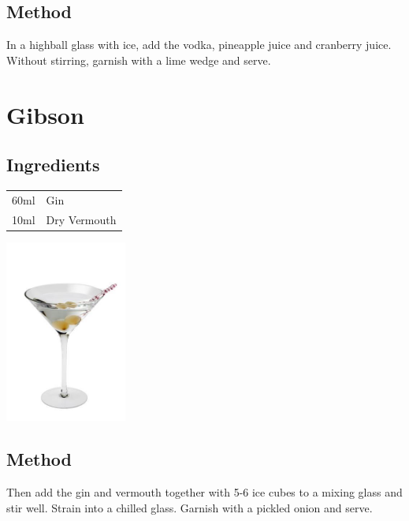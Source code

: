 \documentclass[12pt, letterpaper]{article}
\begin{document}
\subsection*{Method}
In a highball glass with ice, add the vodka, pineapple juice and cranberry juice.
Without stirring, garnish with a lime wedge and serve.

\pagebreak
\section{Gibson}

\subsection*{Ingredients}

\begin{multicols}{2}

\begin{tabular} { r | l}
    60ml & Gin \\
    10ml & Dry Vermouth \\
\end{tabular}

\includegraphics[height=6cm]{gibson}

\end{multicols}

\subsection*{Method}
Then add the gin and vermouth together with 5-6 ice cubes to a mixing glass and stir well.
Strain into a chilled glass. Garnish with a pickled onion and serve.
\end{document}
